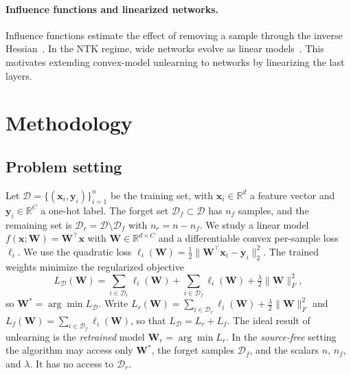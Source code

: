 \documentclass[10pt,twocolumn,letterpaper]{article}
\newcommand{\Wstar}{\mathbf{W}^{*}}
\newcommand{\Dr}{\mathcal{D}_r}
\newcommand{\Df}{\mathcal{D}_f}
\begin{document}
\paragraph{Influence functions and linearized networks.}
Influence functions estimate the effect of removing a sample through the inverse Hessian~\cite{koh2017understanding}. In the NTK regime, wide networks evolve as linear models~\cite{lee2019wide}. This motivates extending convex-model unlearning to networks by linearizing the last layers.

\section{Methodology}
\label{sec:method}
\subsection{Problem setting}
Let $\mathcal{D}=\{(\mathbf{x}_i,\mathbf{y}_i)\}_{i=1}^{n}$ be the training set, with $\mathbf{x}_i\in\mathbb{R}^{d}$ a feature vector and $\mathbf{y}_i\in\mathbb{R}^{C}$ a one-hot label. The forget set $\Df\subset\mathcal{D}$ has $n_f$ samples, and the remaining set is $\Dr=\mathcal{D}\setminus\Df$ with $n_r=n-n_f$. We study a linear model $f(\mathbf{x};\mathbf{W})=\mathbf{W}^{\top}\mathbf{x}$ with $\mathbf{W}\in\mathbb{R}^{d\times C}$ and a differentiable convex per-sample loss $\ell_i$. We use the quadratic loss $\ell_i(\mathbf{W})=\tfrac12\|\mathbf{W}^\top\mathbf{x}_i-\mathbf{y}_i\|_2^2$. The trained weights minimize the regularized objective
\begin{equation}
  L_{\mathcal{D}}(\mathbf{W}) = \sum_{i\in\Dr}\ell_i(\mathbf{W}) + \sum_{i\in\Df}\ell_i(\mathbf{W}) + \tfrac{\lambda}{2}\|\mathbf{W}\|_F^2,
  \label{eq:obj}
\end{equation}
so $\Wstar=\arg\min L_{\mathcal{D}}$. Write $L_r(\mathbf{W})=\sum_{i\in\Dr}\ell_i(\mathbf{W})+\frac{\lambda}{2}\|\mathbf{W}\|_F^2$ and $L_f(\mathbf{W})=\sum_{i\in\Df}\ell_i(\mathbf{W})$, so that $L_{\mathcal{D}}=L_r+L_f$. The ideal result of unlearning is the \emph{retrained} model $\mathbf{W}_r=\arg\min L_r$. In the \emph{source-free} setting the algorithm may access only $\Wstar$, the forget samples $\Df$, and the scalars $n$, $n_f$, and $\lambda$. It has no access to $\Dr$.
\end{document}
